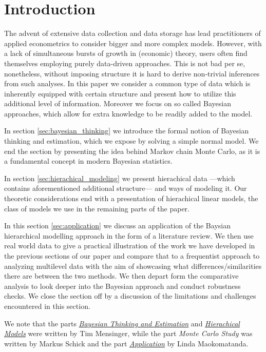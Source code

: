 \section{Introduction}

The advent of extensive data collection and data storage has lead practitioners of applied econometrics to consider bigger and more complex models.
However, with a lack of simultaneous bursts of growth in (economic) theory, users often find themselves employing purely data-driven approaches.
This is not bad per se, nonetheless, without imposing structure it is hard to derive non-trivial inferences from such analyses.
In this paper we consider a common type of data which is inherently equipped with certain structure and present how to utilize this additional level of information.
Moreover we focus on so called Bayesian approaches, which allow for extra knowledge to be readily added to the model.

In section \ref{sec:bayesian_thinking} we introduce the formal notion of Bayesian thinking and estimation, which we expose by solving a simple normal model.
We end the section by presenting the idea behind Markov chain Monte Carlo, as it is a fundamental concept in modern Bayesian statistics.

In section \ref{sec:hierachical_modeling} we present hierachical data ---which contains aforementioned additional structure--- and ways of modeling it.
Our theoretic considerations end with a presentation of hierachical linear models, the class of models we use in the remaining parts of the paper.

In this section \ref{sec:application} we discuss an application of the Baysian hierarchical modelling approach in the form of a literature review. We then use real world data to give a practical illustration of the work we have developed in the previous sections of our paper and compare that to a frequentist approach to analyzing multilevel data with the aim of showcasing what differences/similarities there are between the two methods. We then depart form the comparative analysis to look deeper into the Bayesian approach and conduct robustness checks. We close the section off by a discussion of the limitations and challenges encountered in this section.

We note that the parts \hyperref[sec:bayesian_thinking]{\emph{Bayesian Thinking and Estimation}} and \hyperref[sec:hierachical_modeling]{\emph{Hierachical Models}} were written by Tim Mensinger, while the part \emph{Monte Carlo Study} was written by Markus Schick and the part \hyperref[sec:application]{\emph{Application}} by Linda Maokomatanda.
